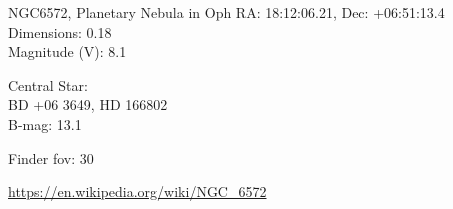 \begin{block}{NGC6572, Planetary Nebula in Oph}
    RA: 18:12:06.21, Dec: +06:51:13.4 \\ 
    Dimensions: 0.18 \\ 
    Magnitude (V): 8.1


    Central Star: \\ 
      \hspace{1em}BD +06 3649, HD 166802 \\ 
      \hspace{1em}B-mag: 13.1 


    Finder fov: 30 

    \url{https://en.wikipedia.org/wiki/NGC_6572} 
\end{block}